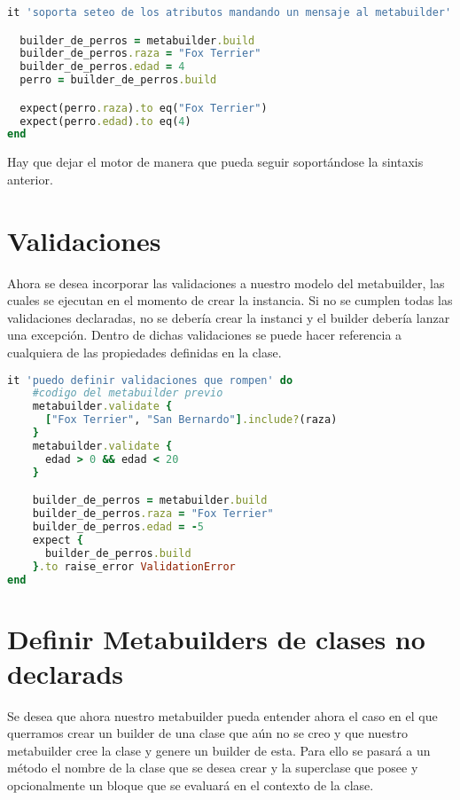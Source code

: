\documentclass[spanish,a4paper]{article}
\begin{document}
  \begin{lstlisting}[language=Ruby]
it 'soporta seteo de los atributos mandando un mensaje al metabuilder' do

  builder_de_perros = metabuilder.build
  builder_de_perros.raza = "Fox Terrier"
  builder_de_perros.edad = 4
  perro = builder_de_perros.build

  expect(perro.raza).to eq("Fox Terrier")
  expect(perro.edad).to eq(4)
end
  \end{lstlisting}

Hay que dejar el motor de manera que pueda seguir soportándose la sintaxis anterior.

\section{Validaciones}

Ahora se desea incorporar las validaciones a nuestro modelo del metabuilder, las cuales se ejecutan en el momento de crear la instancia. Si no se cumplen todas las validaciones declaradas, no se debería crear la instanci y
el builder debería lanzar una excepción. Dentro de dichas validaciones se puede hacer referencia a cualquiera de las propiedades definidas en la clase.

  \begin{lstlisting}[language=Ruby]
it 'puedo definir validaciones que rompen' do
    #codigo del metabuilder previo
    metabuilder.validate {
      ["Fox Terrier", "San Bernardo"].include?(raza)
    }
    metabuilder.validate {
      edad > 0 && edad < 20
    }

    builder_de_perros = metabuilder.build
    builder_de_perros.raza = "Fox Terrier"
    builder_de_perros.edad = -5
    expect {
      builder_de_perros.build
    }.to raise_error ValidationError
end
  \end{lstlisting}

\section{Definir Metabuilders de clases no declarads}

Se desea que ahora nuestro metabuilder pueda entender ahora el caso en el que querramos crear un builder de una clase que aún no se creo y que nuestro
metabuilder cree la clase y genere un builder de esta. Para ello se pasará a un método el nombre de la clase que se desea crear y la superclase que posee
y opcionalmente un bloque que se evaluará en el contexto de la clase.
\end{document}
